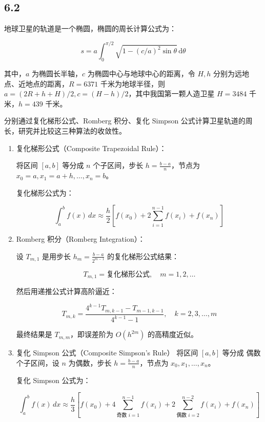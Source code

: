 \subsection*{6.2}
地球卫星的轨道是一个椭圆，椭圆的周长计算公式为：

\[ s = a \int_0^{\pi/2} \sqrt{1 - (c/a)^2 \sin \theta} \, \mathrm{d}\theta \]

其中，$a$ 为椭圆长半轴，$c$ 为椭圆中心与地球中心的距离，令 $H, h$ 分别为远地点、近地点的距离，$R=6371$ 千米为地球半径，则 $a = (2R + h + H)/2, c = (H - h)/2$，其中我国第一颗人造卫星 $H = 3484$ 千米，$h = 439$ 千米。

分别通过复化梯形公式、Romberg 积分、复化 Simpson 公式计算卫星轨道的周长，研究并比较这三种算法的收敛性。


\begin{enumerate}
    \item 复化梯形公式（Composite Trapezoidal Rule）：
    
    将区间 $[a,b]$ 等分成 $n$ 个子区间，步长 $h = \frac{b - a}{n}$，节点为 $x_0 = a, x_1 = a + h, \dots, x_n = b$。

    复化梯形公式为：
    
    $$
    \int_a^b f(x)\, dx \approx \frac{h}{2} \left[ f(x_0) + 2 \sum_{i=1}^{n-1} f(x_i) + f(x_n) \right]
    $$

    \item Romberg 积分（Romberg Integration）：
    
    设 $T_{m,1}$ 是用步长 $h_m = \frac{b-a}{2^{m-1}}$ 的复化梯形公式结果：

    $$
    T_{m,1} = \text{复化梯形公式},\quad m = 1, 2, \dots
    $$

    然后用递推公式计算高阶逼近：
    
    $$
    T_{m,k} = \frac{4^{k-1} T_{m,k-1} - T_{m-1,k-1}}{4^{k-1} - 1}, \quad k = 2,3,\dots,m
    $$

    最终结果是 $T_{m,m}$，即误差阶为 $O(h^{2m})$ 的高精度近似。
    \item 复化 Simpson 公式（Composite Simpson's Rule）
    将区间 $[a,b]$ 等分成 偶数个子区间，设 $n$ 为偶数，步长 $h = \frac{b - a}{n}$，节点为 $x_0, x_1, \dots, x_n$。

    复化 Simpson 公式为：
    
    $$
    \int_a^b f(x)\, dx \approx \frac{h}{3} \left[ f(x_0) + 4 \sum_{\text{奇数 } i=1}^{n-1} f(x_i) + 2 \sum_{\text{偶数 } i=2}^{n-2} f(x_i) + f(x_n) \right]
    $$
\end{enumerate}

